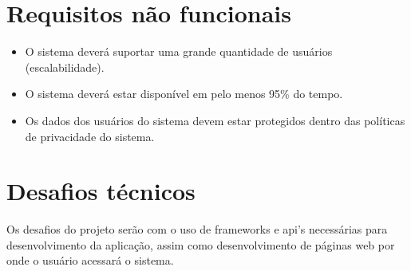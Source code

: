 \documentclass[11pt,a4paper]{article}
\begin{document}
	\section*{Requisitos não funcionais}
		\begin{itemize}
			\item O sistema deverá suportar uma grande quantidade de usuários (escalabilidade).
			\item O sistema deverá estar disponível em pelo menos 95\% do tempo.
			\item Os dados dos usuários do sistema devem estar protegidos dentro das políticas de privacidade do sistema.
		\end{itemize}

	\section*{Desafios técnicos}
		Os desafios do projeto serão com o uso de frameworks e api's necessárias para desenvolvimento da aplicação, assim como desenvolvimento de páginas web por onde o usuário acessará o sistema.
\end{document}
